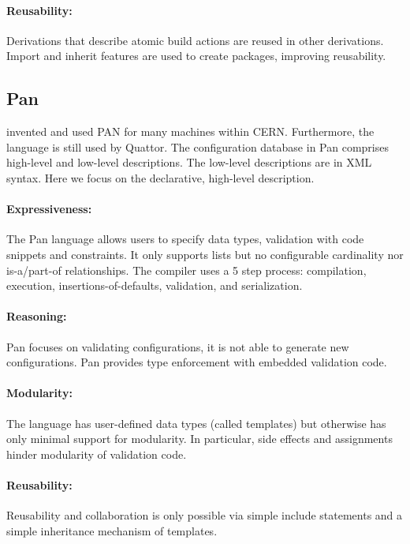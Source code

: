 \paragraph*{Reusability:}
Derivations that describe atomic build actions are reused in other derivations.
Import and inherit features are used to create packages, improving reusability.



\subsection{Pan}

\citet{cons2002pan} invented and used PAN for many machines within CERN.
Furthermore, the language is still used by Quattor.
The configuration database in Pan comprises high-level and low-level descriptions.
The low-level descriptions are in XML syntax.
Here we focus on the declarative, high-level description.

\paragraph*{Expressiveness:}
The Pan language allows users to specify data types, validation with code snippets and constraints.
It only supports lists but no configurable cardinality nor is-a/part-of relationships.
The compiler uses a 5 step process: compilation, execution, insertions-of-defaults, validation, and serialization.

\paragraph*{Reasoning:}
Pan focuses on validating configurations, it is not able to generate new configurations.
Pan provides type enforcement with embedded validation code.

\paragraph*{Modularity:}
The language has user-defined data types (called templates) but otherwise has only minimal support for modularity.
In particular, side effects and assignments hinder modularity of validation code.

\paragraph*{Reusability:}
Reusability and collaboration is only possible via simple include statements and a simple inheritance mechanism of templates.






